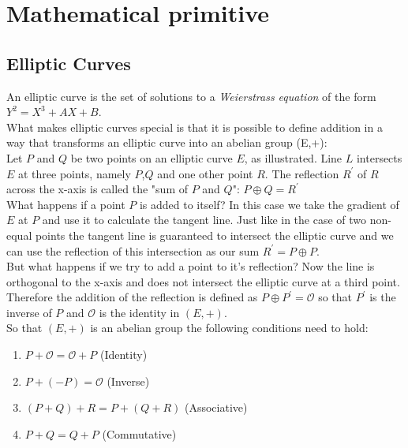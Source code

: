 \section{Mathematical primitive}
\subsection{Elliptic Curves}
An elliptic curve is the set of solutions to a \textit{Weierstrass equation} of the form $Y^2=X^3+AX+B$.\\ 


What makes elliptic curves special is that it is possible to define addition in a way that transforms an elliptic curve into an abelian group (E,+):\\
Let $P$ and $Q$ be two points on an elliptic curve $E$, as illustrated. %
Line $L$ intersects $E$ at three points, namely $P$,$Q$ and one other point $R$. The reflection $R^{\prime}$ of $R$ across the x-axis is called the "sum of $P$ and $Q$": $P \oplus Q = R^{\prime}$\\

What happens if a point $P$ is added to itself? In this case we take the gradient of $E$ at $P$ and use it to calculate the tangent line. %
Just like in the case of two non-equal points the tangent line is guaranteed to intersect the elliptic curve and we can use the reflection of this intersection as our sum $R^{\prime} = P \oplus P$. \\

But what happens if we try to add a point to it's reflection? Now the line is orthogonal to the x-axis and does not intersect the elliptic curve at a third point. Therefore the addition of the reflection is defined as $P \oplus P^{\prime} = \mathcal{O}$ so that $P^{\prime}$ is the inverse of $P$ and $\mathcal{O}$ is the identity in $(E,+)$.\\

So that $(E,+)$ is an abelian group the following conditions need to hold:

	\begin{enumerate}[1.]
	\item $P + \mathcal{O} = \mathcal{O} + P$ (Identity)
	\item $P + (-P) = \mathcal{O}$ (Inverse)
	\item $(P + Q) + R = P + (Q + R) $ (Associative)
	\item $P + Q = Q + P$ (Commutative)
	\end{enumerate}

